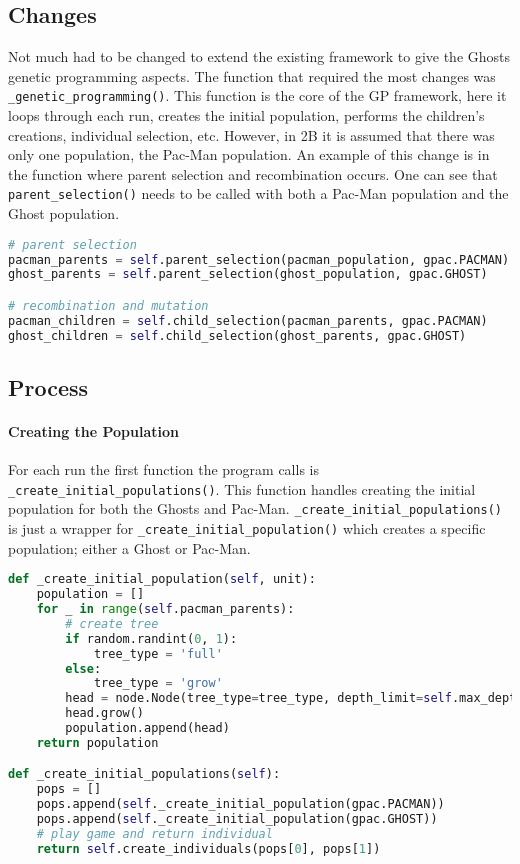 \subsection{Changes}

Not much had to be changed to extend the existing framework to give the Ghosts genetic programming aspects.
The function that required the most changes was \texttt{\_genetic\_programming()}. 
This function is the core of the GP framework, here it loops through each run, creates the initial population, performs the children's creations, individual selection, etc.
However, in 2B it is assumed that there was only one population, the Pac-Man population.
An example of this change is in the function where parent selection and recombination occurs.
One can see that \texttt{parent\_selection()} needs to be called with both a Pac-Man population and the Ghost population. \\

\begin{lstlisting}[language=Python]
# parent selection
pacman_parents = self.parent_selection(pacman_population, gpac.PACMAN)
ghost_parents = self.parent_selection(ghost_population, gpac.GHOST)

# recombination and mutation
pacman_children = self.child_selection(pacman_parents, gpac.PACMAN)
ghost_children = self.child_selection(ghost_parents, gpac.GHOST)
\end{lstlisting}

\subsection{Process}

\paragraph{Creating the Population}

For each run the first function the program calls is \\ \texttt{\_create\_initial\_populations()}.
This function handles creating the initial population for both the Ghosts and Pac-Man.
\texttt{\_create\_initial\_populations()} is just a wrapper for \texttt{\_create\_initial\_population()} which creates a specific population; either a Ghost or Pac-Man.

\begin{lstlisting}[language=Python]
def _create_initial_population(self, unit):
    population = []
    for _ in range(self.pacman_parents):
        # create tree
        if random.randint(0, 1):
            tree_type = 'full'
        else:
            tree_type = 'grow'
        head = node.Node(tree_type=tree_type, depth_limit=self.max_depth, unit=unit)
        head.grow()
        population.append(head)
    return population

def _create_initial_populations(self):
    pops = []
    pops.append(self._create_initial_population(gpac.PACMAN))
    pops.append(self._create_initial_population(gpac.GHOST))
    # play game and return individual
    return self.create_individuals(pops[0], pops[1])
\end{lstlisting}

